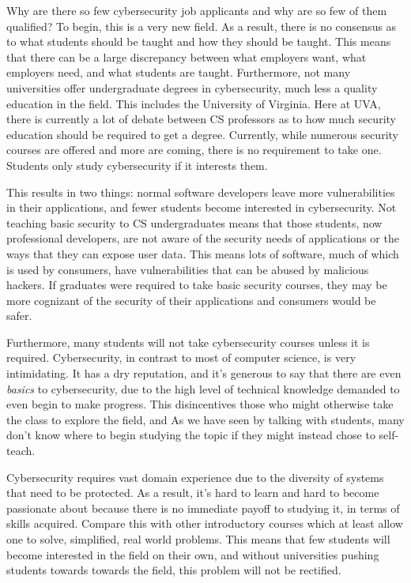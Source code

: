 \documentclass[openright]{report}
\begin{document}
\par Why are there so few cybersecurity job applicants and why are so few of them qualified? To begin, this is a very new field. As a result, there is no consensus as to what students should be taught and how they should be taught\cite{why_no_cyber_classes}. This means that there can be a large discrepancy between what employers want, what employers need, and what students are taught. Furthermore, not many universities offer undergraduate degrees in cybersecurity, much less a quality education in the field. This includes the University of Virginia. Here at UVA, there is currently a lot of debate between CS professors as to how much security education should be required to get a degree\cite{ibrahiminterview}. Currently, while numerous security courses are offered and more are coming, there is no requirement to take one\cite{comsci_handbook}. Students only study cybersecurity if it interests them.

\par This results in two things: normal software developers leave more vulnerabilities in their applications, and fewer students become interested in cybersecurity. Not teaching basic security to CS undergraduates means that those students, now professional developers, are not aware of the security needs of applications or the ways that they can expose user data. This means lots of software, much of which is used by consumers, have vulnerabilities that can be abused by malicious hackers\cite{why_no_cyber_classes}. If graduates were required to take basic security courses, they may be more cognizant of the security of their applications and consumers would be safer.

\par Furthermore, many students will not take cybersecurity courses unless it is required. Cybersecurity, in contrast to most of computer science, is very intimidating. It has a dry reputation, and it's generous to say that there are even \textit{basics} to cybersecurity, due to the high level of technical knowledge demanded to even begin to make progress. This disincentives those who might otherwise take the class to explore the field, and As we have seen by talking with students, many don't know where to begin studying the topic if they might instead chose to self-teach. 

\par Cybersecurity requires vast domain experience due to the diversity of systems that need to be protected. As a result, it's hard to learn and hard to become passionate about because there is no immediate payoff to studying it, in terms of skills acquired. Compare this with other introductory courses which at least allow one to solve, simplified, real world problems. This means that few students will become interested in the field on their own, and without universities pushing students towards towards the field, this problem will not be rectified.
\end{document}

